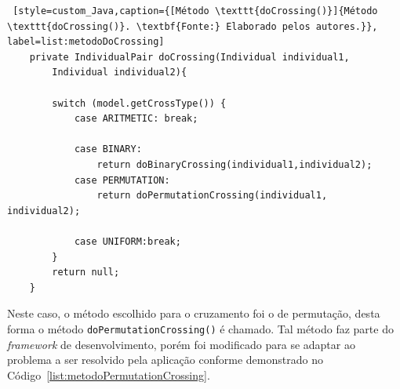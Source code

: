 \begin{lstlisting} [style=custom_Java,caption={[Método \texttt{doCrossing()}]{Método \texttt{doCrossing()}. \textbf{Fonte:} Elaborado pelos autores.}}, label=list:metodoDoCrossing] 
	private IndividualPair doCrossing(Individual individual1, 
		Individual individual2){
		
		switch (model.getCrossType()) {
			case ARITMETIC: break;
			
			case BINARY: 
				return doBinaryCrossing(individual1,individual2);
			case PERMUTATION: 
				return doPermutationCrossing(individual1, individual2);
		
			case UNIFORM:break;
		}
		return null;
	}

\end{lstlisting}


\par Neste caso, o método escolhido para o cruzamento foi o de permutação, desta forma o método \texttt{doPermutationCrossing()} é chamado.
Tal método faz parte do \textit{framework} de desenvolvimento, porém foi modificado para se adaptar ao problema a ser resolvido pela 
aplicação conforme demonstrado no Código~\ref{list:metodoPermutationCrossing}.


